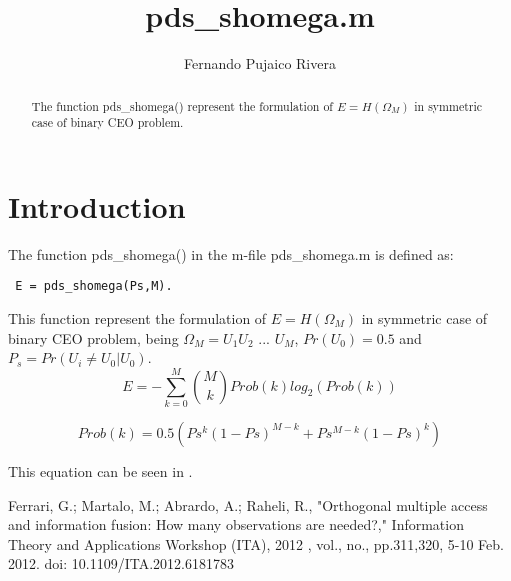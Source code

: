 \documentclass[a4paper,10pt]{article}
\title{pds\_shomega.m}
\author{Fernando Pujaico Rivera}
\begin{document}
\maketitle
\begin{abstract}
The function pds\_shomega() represent the formulation of $E = H(\Omega_M)$ 
in symmetric case of binary CEO problem.
\end{abstract}

\section{Introduction}
The function pds\_shomega() in the m-file pds\_shomega.m is defined as:
\lstset{language=octave}%
\begin{lstlisting}
 E = pds_shomega(Ps,M).
\end{lstlisting}
This function represent the formulation of $E=H(\Omega_M)$ in symmetric case 
of binary CEO problem,
being $\Omega_M=U_1 U_2$ $ ...$ $ U_M$, $Pr(U_0)=0.5$ and $P_s = Pr(U_i \neq U_0|U_0)$.
\begin{equation}
 E = -\sum_{k=0}^M \binom{M}{k} Prob(k)log_2( Prob(k) )
\end{equation}

\begin{equation}
 Prob(k)=0.5 ( Ps^k (1-Ps)^{M-k} + Ps^{M-k} (1-Ps)^k )
\end{equation}


This equation can be seen in \cite{shomega}.

\begin{thebibliography}{99}
 
Ferrari, G.; Martalo, M.; Abrardo, A.; Raheli, R., "Orthogonal multiple 
access and information fusion: How many observations are needed?," 
Information Theory and Applications Workshop (ITA), 2012 , vol., no., 
pp.311,320, 5-10 Feb. 2012. doi: 10.1109/ITA.2012.6181783

\end{thebibliography}  
\end{document}
